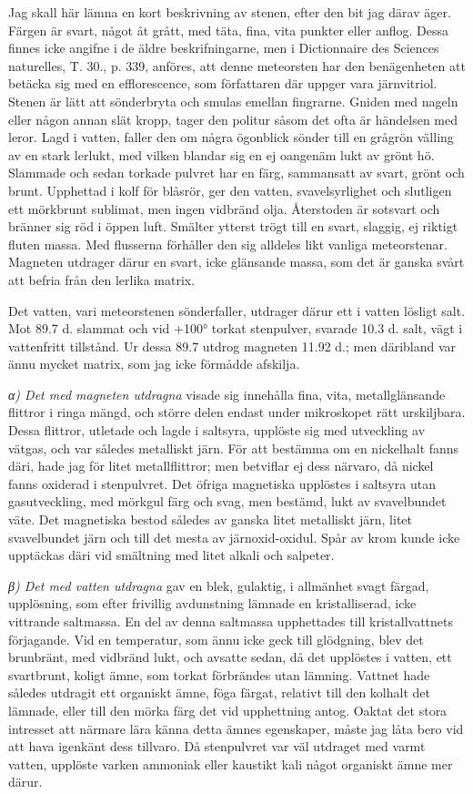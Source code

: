 \documentclass[a4paper, 12pt, oneside, swedish]{article}
\begin{document}
Jag skall här lämna en kort beskrivning av stenen, efter den bit jag därav äger. Färgen är svart, något åt grått, med täta, fina, vita punkter eller anflog. Dessa finnes icke angifne i de äldre beskrifningarne, men i Dictionnaire des Sciences naturelles, T. 30., p. 339, anföres, att denne meteorsten har den benägenheten att betäcka sig med en efflorescence, som författaren där uppger vara järnvitriol. Stenen är lätt att sönderbryta och smulas emellan fingrarne. Gniden med nageln eller någon annan slät kropp, tager den politur såsom det ofta är händelsen med leror. Lagd i vatten, faller den om några ögonblick sönder till en grågrön välling av en stark lerlukt, med vilken blandar sig en ej oangenäm lukt av grönt hö. Slammade och sedan torkade pulvret har en färg, sammansatt av svart, grönt och brunt. Upphettad i kolf för blåsrör, ger den vatten, svavelsyrlighet och slutligen ett mörkbrunt sublimat, men ingen vidbränd olja. Återstoden är sotsvart och bränner sig röd i öppen luft. Smälter ytterst trögt till en svart, slaggig, ej riktigt fluten massa. Med flusserna förhåller den sig alldeles likt vanliga meteorstenar. Magneten utdrager därur en svart, icke glänsande massa, som det är ganska svårt att befria från den lerlika matrix.

Det vatten, vari meteorstenen sönderfaller, utdrager därur ett i vatten lösligt salt. Mot 89.7 d. slammat och vid +100° torkat stenpulver, svarade 10.3 d. salt, vägt i vattenfritt tillstånd. Ur dessa 89.7 utdrog magneten 11.92 d.; men däribland var ännu mycket matrix, som jag icke förmådde afskilja.

\emph{α) Det med magneten utdragna} visade sig innehålla fina, vita, metallglänsande flittror i ringa mängd, och större delen endast under mikroskopet rätt urskiljbara. Dessa flittror, utletade och lagde i saltsyra, upplöste sig med utveckling av vätgas, och var således metalliskt järn. För att bestämma om en nickelhalt fanns däri, hade jag för litet metallflittror; men betviflar ej dess närvaro, då nickel fanns oxiderad i stenpulvret. Det öfriga magnetiska upplöstes i saltsyra utan gasutveckling, med mörkgul färg och svag, men bestämd, lukt av svavelbundet väte. Det magnetiska bestod således av ganska litet metalliskt järn, litet svavelbundet järn och till det mesta av järnoxid-oxidul. Spår av krom kunde icke upptäckas däri vid smältning med litet alkali och salpeter.

\emph{β) Det med vatten utdragna} gav en blek, gulaktig, i allmänhet svagt färgad, upplösning, som efter frivillig avdunstning lämnade en kristalliserad, icke vittrande saltmassa. En del av denna saltmassa upphettades till kristallvattnets förjagande. Vid en temperatur, som ännu icke geck till glödgning, blev det brunbränt, med vidbränd lukt, och avsatte sedan, då det upplöstes i vatten, ett svartbrunt, koligt ämne, som torkat förbrändes utan lämning. Vattnet hade således utdragit ett organiskt ämne, föga färgat, relativt till den kolhalt det lämnade, eller till den mörka färg det vid upphettning antog. Oaktat det stora intresset att närmare lära känna detta ämnes egenskaper, måste jag låta bero vid att hava igenkänt dess tillvaro. Då stenpulvret var väl utdraget med varmt vatten, upplöste varken ammoniak eller kaustikt kali något organiskt ämne mer därur.
\end{document}
